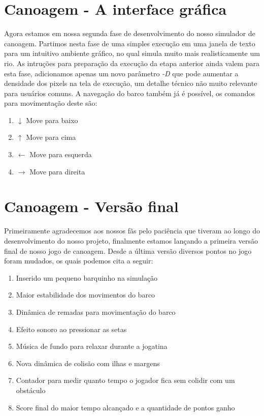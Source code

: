 \documentclass[a4paper,11pt]{article}
\begin{document}
\section{Canoagem - A interface gráfica}
Agora estamos em nossa segunda fase de desenvolvimento do nosso simulador de canoagem. Partimos nesta fase de uma simples execução em uma janela de texto para um intuitivo ambiente gráfico, no qual simula muito mais realisticamente um rio. As intruções para preparação da execução da etapa anterior ainda valem para esta fase, adicionamos apenas um novo parâmetro \textit{-D} que pode aumentar a densidade dos pixels na tela de execução, um detalhe técnico não muito relevante para usuários comuns. A navegação do barco também já é possível, os comandos para movimentação deste são:

\begin{enumerate}
\item[]{ $\downarrow$ Move para baixo}
\item[]{ $\uparrow$ Move para cima}
\item[]{  $\leftarrow$ Move para esquerda}
\item[]{   $\rightarrow$ Move para direita}



\end{enumerate}

\section{Canoagem - Versão final}
Primeiramente agradecemos aos nossos fãs pelo paciência que tiveram ao longo do desenvolvimento do nosso projeto, finalmente estamos lan\c{c}ando a primeira versão final de nosso jogo de canoagem. Desde a última versão diversos pontos no jogo foram mudados, os quais podemos cita a seguir:

\begin{enumerate}
\item[]{Inserido um pequeno barquinho na simula\c{c}ão}
\item[]{Maior estabilidade dos movimentos do barco}
\item[]{Dinâmica de remadas para movimenta\c{c}ão do barco}
\item[]{Efeito sonoro ao pressionar as setas}
\item[]{Música de fundo para relaxar durante a jogatina}
\item[]{Nova dinâmica de colisão com ilhas e margens}
\item[]{Contador para medir quanto tempo o jogador fica sem colidir com um obstáculo}
\item[]{Score final do maior tempo alcan\c{c}ado e a quantidade de pontos ganho}
\end{enumerate}
\end{document}
